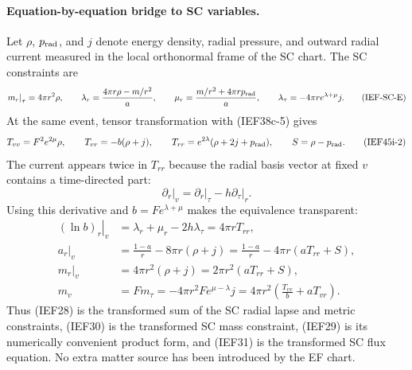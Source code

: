 \paragraph{Equation-by-equation bridge to SC variables.}
Let \(\rho\), \(p_{\rm rad}\), and \(j\) denote energy density, radial pressure,
and outward radial current measured in the local orthonormal frame of the SC
chart.  The SC constraints are
\[
 \left.m_r\right|_\tau=4\pi r^2\rho,\qquad
 \lambda_r=\frac{4\pi r\rho-m/r^2}{a},\qquad
 \mu_r=\frac{m/r^2+4\pi rp_{\rm rad}}{a},\qquad
 \lambda_\tau=-4\pi r e^{\lambda+\mu}j.                  \tag{IEF-SC-E}
\]
At the same event, tensor transformation with (IEF38c-5) gives
\[
 T_{vv}=F^2e^{2\mu}\rho,\qquad
 T_{vr}=-b(\rho+j),\qquad
 T_{rr}=e^{2\lambda}(\rho+2j+p_{\rm rad}),\qquad
 S=\rho-p_{\rm rad}.                                     \tag{IEF45i-2}
\]
The current appears twice in \(T_{rr}\) because the radial basis vector at
fixed \(v\) contains a time-directed part:
\[
 \left.\partial_r\right|_v
 =\left.\partial_r\right|_\tau-h\left.\partial_\tau\right|_r.
\]
Using this derivative and \(b=F e^{\lambda+\mu}\) makes the equivalence
transparent:
\begin{align}
 \left.(\ln b)_r\right|_v
 &=\lambda_r+\mu_r-2h\lambda_\tau
   =4\pi rT_{rr},                                        \tag{IEF-SC-E1}\\
 \left.a_r\right|_v
 &=\frac{1-a}{r}-8\pi r(\rho+j)
   =\frac{1-a}{r}-4\pi r(aT_{rr}+S),                     \tag{IEF-SC-E2}\\
 \left.m_r\right|_v
 &=4\pi r^2(\rho+j)
   =2\pi r^2(aT_{rr}+S),                                 \tag{IEF-SC-E3}\\
 m_v&=F m_\tau=-4\pi r^2F e^{\mu-\lambda}j
   =4\pi r^2\left(\frac{T_{vv}}b+aT_{vr}\right).         \tag{IEF-SC-E4}
\end{align}
Thus (IEF28) is the transformed sum of the SC radial lapse and metric
constraints, (IEF30) is the transformed SC mass constraint, (IEF29) is its
numerically convenient product form, and (IEF31) is the transformed SC flux
equation.  No extra matter source has been introduced by the EF chart.

